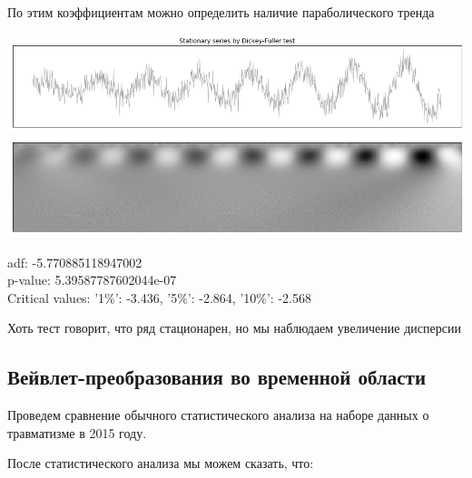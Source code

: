 \documentclass[a4paper]{article}
\begin{document}
	По этим коэффициентам можно определить наличие параболического тренда
	
	\newpage
	\begin{center}
		\includegraphics[scale=0.45]{./output_13_0.png}
		\includegraphics[scale=0.45]{./output_13_1.png}
		
		adf: -5.770885118947002 \\
		p-value: 5.39587787602044e-07 \\
		Critical values: {'1\%': -3.436, '5\%': -2.864, '10\%':
			-2.568}
	\end{center}
	
	Хоть тест говорит, что ряд стационарен, но мы наблюдаем увеличение дисперсии
	
	\subsection{Вейвлет-преобразования во временной области}
	
	Проведем сравнение обычного статистического анализа на наборе данных о травматизме в 2015 году.
	
	После статистического анализа мы можем сказать, что:\\
	
\end{document}
